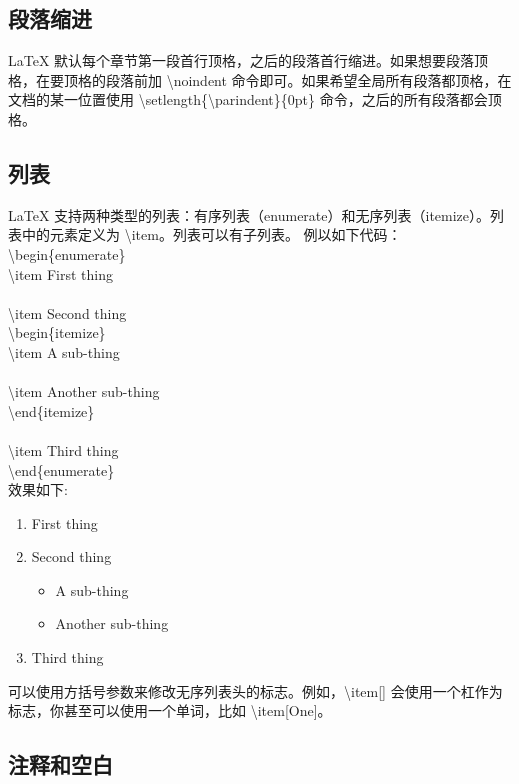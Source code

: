 \documentclass{article}
\begin{document}
\subsection{段落缩进}
LaTeX 默认每个章节第一段首行顶格，之后的段落首行缩进。如果想要段落顶格，在要顶格的段落前加 \textbackslash noindent 命令即可。如果希望全局所有段落都顶格，在文档的某一位置使用 \textbackslash setlength\{\textbackslash parindent\}\{0pt\} 命令，之后的所有段落都会顶格。

\subsection{列表}
LaTeX 支持两种类型的列表：有序列表（enumerate）和无序列表（itemize）。列表中的元素定义为 \textbackslash item。列表可以有子列表。
例以如下代码：
\textbackslash begin\{enumerate\}\\
  \textbackslash item First thing\\
\\
\textbackslash item Second thing\\
    \textbackslash begin\{itemize\}\\
      \textbackslash item A sub-thing\\
\\
      \textbackslash item Another sub-thing\\
    \textbackslash end\{itemize\}\\
\\
  \textbackslash item Third thing\\
\textbackslash end\{enumerate\}\\
效果如下:\\
\begin{enumerate}
  \item First thing

  \item Second thing
    \begin{itemize}
      \item A sub-thing

      \item Another sub-thing
    \end{itemize}

  \item Third thing
\end{enumerate}

可以使用方括号参数来修改无序列表头的标志。例如，\textbackslash item[\-] 会使用一个杠作为标志，你甚至可以使用一个单词，比如 \textbackslash item[One]。

\subsection{注释和空白}
\end{document}
